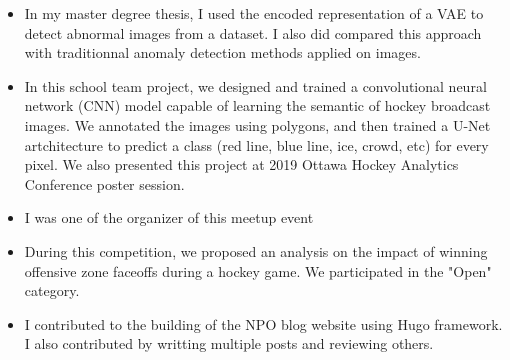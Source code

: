 \begin{itemize}
\item In my master degree thesis, I used the encoded representation of a VAE to detect abnormal images from a dataset. I also did compared this approach with traditionnal anomaly detection methods applied on images.
\end{itemize}
\smallskip
\smallskip
{}
\begin{itemize}
\item In this school team project, we designed and trained a convolutional neural network (CNN) model capable of learning the semantic of hockey broadcast images. We annotated the images using polygons, and then trained a U-Net artchitecture to predict a class (red line, blue line, ice, crowd, etc) for every pixel. We also presented this project at 2019 Ottawa Hockey Analytics Conference poster session.
\end{itemize}
\smallskip
\smallskip
{}
\begin{itemize}
\item I was one of the organizer of this meetup event 
\end{itemize}
\smallskip
\smallskip
{}
\begin{itemize}
\item During this competition, we proposed an analysis on the impact of winning offensive zone faceoffs during a hockey game. We participated in the "Open" category.
\end{itemize}
\smallskip
\smallskip
{}
\begin{itemize}
\item I contributed to the building of the NPO blog website using Hugo framework. I also contributed by writting multiple posts and reviewing others.
\end{itemize}
\smallskip
\smallskip
